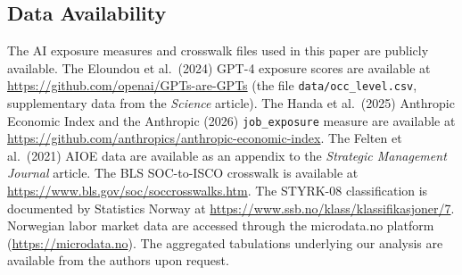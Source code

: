 \subsection*{Data Availability}

The AI exposure measures and crosswalk files used in this paper are publicly available. The Eloundou et al.\ (2024) GPT-4 exposure scores are available at \url{https://github.com/openai/GPTs-are-GPTs} (the file \texttt{data/occ\_level.csv}, supplementary data from the \textit{Science} article). The Handa et al.\ (2025) Anthropic Economic Index and the Anthropic (2026) \texttt{job\_exposure} measure are available at \url{https://github.com/anthropics/anthropic-economic-index}. The Felten et al.\ (2021) AIOE data are available as an appendix to the \textit{Strategic Management Journal} article. The BLS SOC-to-ISCO crosswalk is available at \url{https://www.bls.gov/soc/soccrosswalks.htm}. The STYRK-08 classification is documented by Statistics Norway at \url{https://www.ssb.no/klass/klassifikasjoner/7}. Norwegian labor market data are accessed through the microdata.no platform (\url{https://microdata.no}). The aggregated tabulations underlying our analysis are available from the authors upon request.


